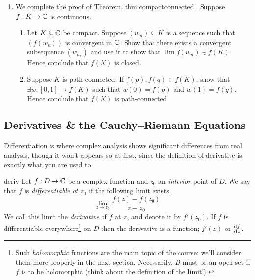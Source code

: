 \begin{exercises*}{}{}
\begin{enumerate}
  \item We complete the proof of Theorem \ref{thm:compactconnected}. Suppose $f:K\to\C$ is continuous.
  \begin{enumerate}
    \item Let $K\subseteq \C$ be compact. Suppose $(w_n)\subseteq K$ is a sequence such that $(f(w_n))$ is convergent in $\C$. Show that there exists a convergent subsequence $(w_{n_k})$ and use it to show that $\lim f(w_n)\in f(K)$. Hence conclude that $f(K)$ is closed.
		\item Suppose $K$ is path-connected. If $f(p),f(q)\in f(K)$, show that $\exists w:[0,1]\to f(K)$ such that $w(0)=f(p)$ and $w(1)=f(q)$. Hence conclude that $f(K)$ is path-connected.
  \end{enumerate}
\end{enumerate}
\end{exercises*}

\clearpage

\subsection[Derivatives \& the Cauchy--Riemann Equations]{Derivatives \& the Cauchy--Riemann Equations}%

Differentiation is where complex analysis shows significant differences from real analysis, though it won't appears so at first, since the definition of derivative is exactly what you are used to.

\begin{defn}{}{deriv}
Let $f:D\to\C$ be a complex function and $z_0$ an \emph{interior} point of $D$. We say that $f$ is \emph{differentiable at $z_0$} if the following limit exists.
\[\lim_{z\to z_0}\frac{f(z)-f(z_0)}{z-z_0}\]
We call this limit the \emph{derivative} of $f$ at $z_0$ and denote it by $f'(z_0)$. If $f$ is differentiable everywhere\footnote{Such \emph{holomorphic} functions are the main topic of the course: we'll consider them more properly in the next section. Necessarily, $D$ must be an open set if $f$ is to be holomorphic (think about the definition of the limit!).} on $D$ then the derivative is a function; $f'(z)$ or $\diff[f]{z}$. 
\end{defn}

